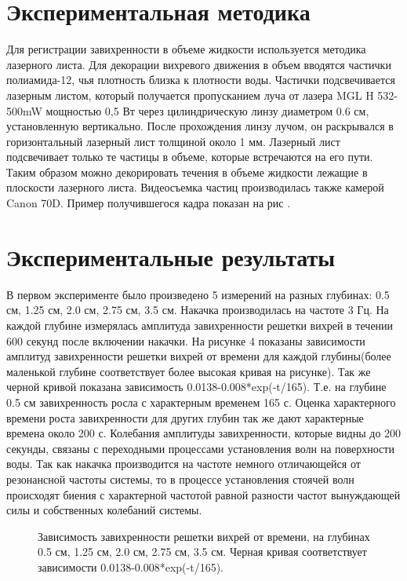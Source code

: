 \section{Экспериментальная методика} \label{sect6_2}
Для регистрации завихренности в объеме жидкости используется методика лазерного листа. Для декорации вихревого движения в объем вводятся частички полиамида-12, чья плотность близка к плотности воды. Частички подсвечивается лазерным листом, который получается пропусканием луча от лазера MGL H 532-500mW мощностью 0,5 Вт  через цилиндрическую линзу диаметром 0.6 см, установленную вертикально. После прохождения линзу лучом, он раскрывался в горизонтальный лазерный лист толщиной около 1 мм. Лазерный лист подсвечивает только те частицы в объеме, которые встречаются на его пути. Таким образом можно декорировать течения в объеме жидкости лежащие в плоскости лазерного листа. Видеосъемка частиц производилась также камерой Canon 70D. Пример получившегося кадра показан на рис .


\section{Экспериментальные результаты} \label{sect6_3}

В первом эксперименте было произведено 5 измерений на разных глубинах: 0.5 см, 1.25 см, 2.0 см, 2.75 см, 3.5 см. Накачка производилась на частоте 3 Гц. На каждой глубине измерялась амплитуда завихренности решетки вихрей в течении 600 секунд после включении накачки. На рисунке 4 показаны зависимости амплитуд завихренности решетки вихрей от времени для каждой глубины(более маленькой глубине соответствует более высокая кривая на рисунке). Так же черной кривой показана зависимость 0.0138-0.008*exp(-t/165). Т.е. на глубине 0.5 см завихренность росла с характерным временем 165 с. Оценка характерного времени роста завихренности для других глубин так же дают характерные времена около 200 с. Колебания амплитуды завихренности, которые видны до 200 секунды, связаны с переходными процессами установления волн на поверхности воды. Так как накачка производится на частоте немного отличающейся от резонансной частоты системы, то в процессе установления стоячей волн происходят биения с характерной частотой равной разности частот вынуждающей силы и собственных колебаний системы.

\begin{figure}[ht]
  \caption{Зависимость завихренности решетки вихрей от времени, на глубинах 0.5 см, 1.25 см, 2.0 см, 2.75 см, 3.5 см. Черная кривая соответствует зависимости 0.0138-0.008*exp(-t/165).}
  \label{img:5deeps}  
\end{figure}

